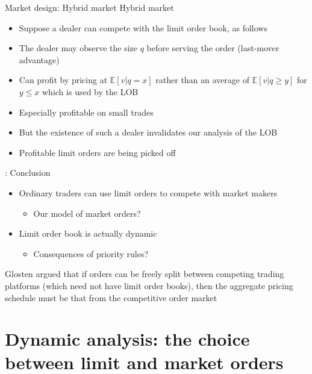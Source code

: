 \documentclass[english,10pt]{beamer}
\begin{document}
\begin{frame}[label=hybridorg]{Market design: Hybrid market}
	Hybrid market
	\begin{itemize}
		\item Suppose a dealer can compete with the limit order book, as follows
		\item The dealer may observe the size $q$ before serving the order (last-mover advantage)
		\item Can profit by pricing at $\mathbb{E}[v|q=x]$ rather than an average of $\mathbb{E}[v|q \geq y]$ for $y \leq x$ which is used by the LOB
		\item Especially profitable on small trades
		\item But the existence of such a dealer invalidates our analysis of the LOB
		\item Profitable limit orders are being picked off
	\end{itemize}
	\hyperlink{hybrid}{}
\end{frame}


\begin{frame}{\cite{glosten_is_1994}: Conclusion}
	\begin{itemize}
		\item Ordinary traders can  use limit orders to compete with market makers
		\begin{itemize}
			\item Our model of market orders?
		\end{itemize}
		\item Limit order book is actually dynamic
		\begin{itemize}
			\item Consequences of priority rules?
		\end{itemize}
	\end{itemize}
	Glosten argued that if orders can be freely split between competing trading platforms (which need not have limit order books), then the aggregate pricing schedule must be that from the competitive order market
\end{frame}



\section{Dynamic analysis: the choice between limit and market orders}
\end{document}

